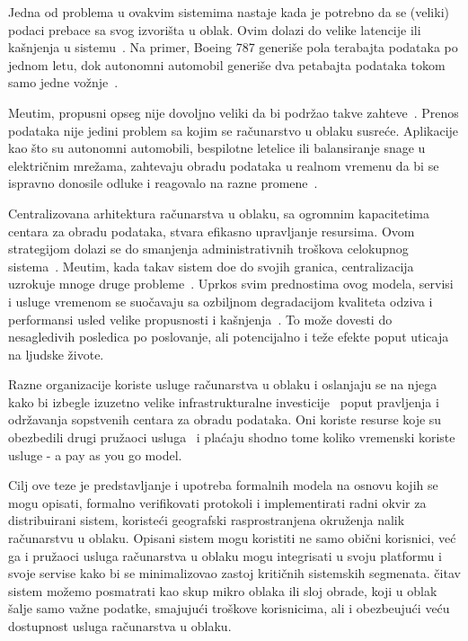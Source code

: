 Jedna od problema u ovakvim sistemima nastaje kada je potrebno da se (veliki) podaci prebace sa svog izvori\v sta u oblak. Ovim dolazi do velike latencije ili ka\v snjenja u sistemu~\cite {HossainRH18}. Na primer, Boeing 787 generi\v se pola terabajta podataka po jednom letu, dok autonomni automobil generi\v se dva petabajta podataka tokom samo jedne vo\v znje~\cite{CaoZS18}. 

Me\dj utim, propusni opseg nije dovoljno veliki da bi podr\v zao takve zahteve~\cite{CaoZS18}. Prenos podataka nije jedini problem sa kojim se ra\v cunarstvo u oblaku susre\'ce. Aplikacije kao \v sto su autonomni automobili, bespilotne letelice ili balansiranje snage u elektri\v cnim mre\v zama, zahtevaju obradu podataka u realnom vremenu da bi se ispravno donosile odluke i reagovalo na razne promene~\cite{CaoZS18}.

Centralizovana arhitektura ra\v cunarstva u oblaku, sa ogromnim kapacitetima centara za obradu podataka, stvara efikasno upravljanje resursima. Ovom strategijom dolazi se do smanjenja administrativnih tro\v skova celokupnog sistema~\cite{BariBEGPRZZ13}. Me\dj utim, kada takav sistem do\dj e do svojih granica, centralizacija uzrokuje mnoge druge probleme~\cite{GunawiHSLSAE16, LopezMEDHIBFR15}. Uprkos svim prednostima ovog modela, servisi i usluge vremenom se suo\v cavaju sa ozbiljnom degradacijom kvaliteta odziva i performansi usled velike propusnosti i ka\v snjenja~\cite{KarimIWGSYO16}. To mo\v ze dovesti do nesagledivih posledica po poslovanje, ali potencijalno i te\v ze efekte poput uticaja na ljudske \v zivote. 

Razne organizacije koriste usluge ra\v cunarstva u oblaku i oslanjaju se na njega kako bi izbegle izuzetno velike infrastrukturalne investicije~\cite {MonsalveCC18} poput pravljenja i odr\v zavanja sopstvenih centara za obradu podataka. Oni koriste resurse koje su obezbedili drugi pru\v zaoci usluga~\cite{Satyanarayanan17} i pla\'caju shodno tome koliko vremenski koriste usluge - a pay as you go model.

Cilj ove teze je predstavljanje i upotreba formalnih modela na osnovu kojih se mogu opisati, formalno verifikovati protokoli i implementirati radni okvir za distribuirani sistem, koriste\'ci geografski rasprostranjena okru\v zenja nalik ra\v cunarstvu u oblaku. Opisani sistem mogu koristiti ne samo obi\v cni korisnici, ve\'c ga i pru\v zaoci usluga ra\v cunarstva u oblaku mogu integrisati u svoju platformu i svoje servise kako bi se minimalizovao zastoj kriti\v cnih sistemskih segmenata. \v citav sistem mo\v zemo posmatrati kao skup mikro oblaka ili sloj obrade, koji u oblak \v salje samo va\v zne podatke, smajuju\'ci tro\v skove korisnicima, ali i obezbe\dj uju\'ci ve\'cu dostupnost usluga ra\v cunarstva u oblaku.

